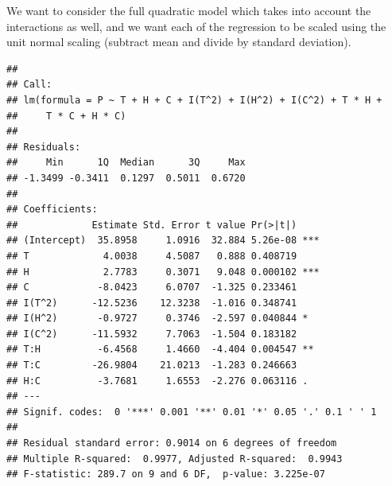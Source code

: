 \documentclass[
  11pt,
]{article}
\newenvironment{Shaded}{\begin{snugshade}}{\end{snugshade}}
\newcommand{\DecValTok}[1]{\textcolor[rgb]{0.00,0.00,0.81}{#1}}
\newcommand{\FunctionTok}[1]{\textcolor[rgb]{0.13,0.29,0.53}{\textbf{#1}}}
\newcommand{\NormalTok}[1]{#1}
\newcommand{\OtherTok}[1]{\textcolor[rgb]{0.56,0.35,0.01}{#1}}
\newcommand{\SpecialCharTok}[1]{\textcolor[rgb]{0.81,0.36,0.00}{\textbf{#1}}}
\begin{document}
We want to consider the full quadratic model which takes into account
the interactions as well, and we want each of the regression to be
scaled using the unit normal scaling (subtract mean and divide by
standard deviation).

\begin{Shaded}
\end{Shaded}

\begin{verbatim}
## 
## Call:
## lm(formula = P ~ T + H + C + I(T^2) + I(H^2) + I(C^2) + T * H + 
##     T * C + H * C)
## 
## Residuals:
##     Min      1Q  Median      3Q     Max 
## -1.3499 -0.3411  0.1297  0.5011  0.6720 
## 
## Coefficients:
##             Estimate Std. Error t value Pr(>|t|)    
## (Intercept)  35.8958     1.0916  32.884 5.26e-08 ***
## T             4.0038     4.5087   0.888 0.408719    
## H             2.7783     0.3071   9.048 0.000102 ***
## C            -8.0423     6.0707  -1.325 0.233461    
## I(T^2)      -12.5236    12.3238  -1.016 0.348741    
## I(H^2)       -0.9727     0.3746  -2.597 0.040844 *  
## I(C^2)      -11.5932     7.7063  -1.504 0.183182    
## T:H          -6.4568     1.4660  -4.404 0.004547 ** 
## T:C         -26.9804    21.0213  -1.283 0.246663    
## H:C          -3.7681     1.6553  -2.276 0.063116 .  
## ---
## Signif. codes:  0 '***' 0.001 '**' 0.01 '*' 0.05 '.' 0.1 ' ' 1
## 
## Residual standard error: 0.9014 on 6 degrees of freedom
## Multiple R-squared:  0.9977, Adjusted R-squared:  0.9943 
## F-statistic: 289.7 on 9 and 6 DF,  p-value: 3.225e-07
\end{verbatim}
\end{document}
